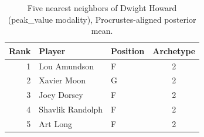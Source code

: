 \begin{table}[htbp]
  \centering\small
  \begin{tabular}{rllc}
    \toprule
    Rank & Player & Position & Archetype \\
    \midrule
    1 & Lou Amundson & F & 2 \\
    2 & Xavier Moon & G & 2 \\
    3 & Joey Dorsey & F & 2 \\
    4 & Shavlik Randolph & F & 2 \\
    5 & Art Long & F & 2 \\
    \bottomrule
  \end{tabular}
  \caption{Five nearest neighbors of Dwight Howard (peak_value modality), Procrustes-aligned posterior mean.}
  \label{tab:Dwight_Howard_neighbors_peak_value}
\end{table}

